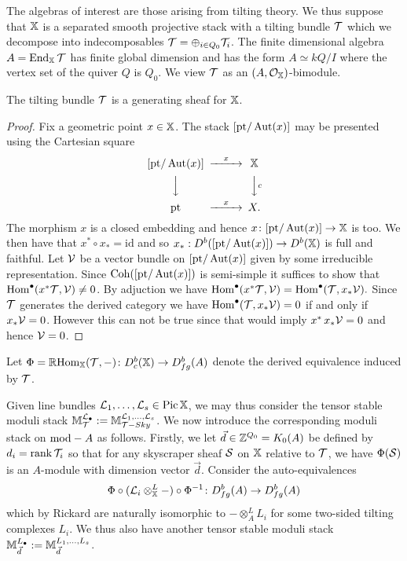 \documentclass[12pt]{amsart}
\begin{document}
The algebras of interest are those arising from tilting theory. We thus suppose that $\mathbb{X}$ is a separated smooth projective stack with a tilting bundle $\mathcal{T}$ which we decompose into indecomposables $\mathcal{T} = \oplus_{i \in Q_0} \mathcal{T}_i$. The finite dimensional algebra $A = \operatorname{End}_{\mathbb{X}}{\mathcal{T}}$ has finite global dimension and has the form $A \simeq kQ/I$ where the vertex set of the quiver $Q$ is $Q_0$. We view $\mathcal{T}$ as an $(A,\mathcal{O}_{\mathbb{X}})$-bimodule. 
\begin{proposition}  \label{prop:Tgenerates}
The tilting bundle $\mathcal{T}$ is a generating sheaf for $\mathbb{X}$.
\end{proposition}
\begin{proof}
Fix a geometric point $x \in \mathbb{X}$. 
The stack $[\text{pt}/\operatorname{Aut}(x)]$ may be presented using the Cartesian square 
\begin{equation*}
\begin{CD}
[\text{pt}/\Aut(x)] @>x>> \bX\\
@VVV @VVcV\\
\text{pt} @>x>> X.
\end{CD}
\end{equation*} 
The morphism $x$ is a closed embedding and hence $x \colon [\text{pt}/\operatorname{Aut}(x)] \rightarrow \mathbb{X}$ is too. 
We then have that $x^* \circ x_* = \text{id}$ and so $x_*: D^b([\text{pt}/\operatorname{Aut}(x)]) \rightarrow D^b(\mathbb{X})$ is full and faithful. 
Let $\mathcal{V}$ be a vector bundle on $[\text{pt}/\operatorname{Aut}(x)]$ given by some irreducible representation. 
Since $\operatorname{Coh}([\text{pt}/\operatorname{Aut}(x)])$ is semi-simple it suffices to show that $\operatorname{Hom}^\bullet(x^* \mathcal{T}, \mathcal{V}) \neq 0$. 
By adjuction we have $\operatorname{Hom}^\bullet(x^* \mathcal{T}, \mathcal{V}) = \operatorname{Hom}^\bullet(\mathcal{T}, x_* \mathcal{V}).$ 
Since $\mathcal{T}$ generates the derived category we have $\operatorname{Hom}^\bullet(\mathcal{T}, x_* \mathcal{V})= 0$ if and only if $x_* \mathcal{V} = 0$. 
However this can not be true since that would imply $x^* \, x_* \mathcal{V} = 0$ and hence $\mathcal{V} =0$. 
\end{proof}
Let $\Phi = \mathop{\mathbb{R}\mathrm{Hom}}\nolimits_{\mathbb{X}}(\mathcal{T},-) \colon D^b_{c}(\mathbb{X}) \to D^b_{fg}(A)$ denote the derived equivalence induced by $\mathcal{T}$. 

Given line bundles $\mathcal{L}_1,\ldots, \mathcal{L}_s \in \operatorname{Pic} \mathbb{X}$, we may thus consider the tensor stable moduli stack $\mathbb{M}_{\mathcal{T}}^{\mathcal{L}_{\bullet}} := \mathbb{M}_{\mathcal{T}-Sky}^{\mathcal{L}_1,\ldots,\mathcal{L}_s}$. We now introduce the corresponding moduli stack on $\textup{mod}-A$ as follows. Firstly, we let $\vec{d}\in \mathbb{Z}^{Q_0} = K_0(A)$ be defined by $d_i = \operatorname{rank} \mathcal{T}_i$ so that for any skyscraper sheaf $\mathcal{S}$ on $\mathbb{X}$ relative to $\mathcal{T}$, we have $\Phi(\mathcal{S})$ is an $A$-module with dimension vector $\vec{d}$. Consider the auto-equivalences
$$ \Phi \circ (\mathcal{L}_i \otimes^L_{\mathbb{X}} -) \circ \Phi^{-1} \colon D^b_{fg}(A) \to D^b_{fg}(A)$$
which by Rickard \cite{MR1002456} are naturally isomorphic to $- \otimes^L_A L_i$ for some two-sided tilting complexes $L_i$. We thus also have another tensor stable moduli stack $\mathbb{M}_{\vec{d}}^{L_{\bullet}} := \mathbb{M}_{\vec{d}}^{L_1,\ldots,L_s}$. 
\end{document}
